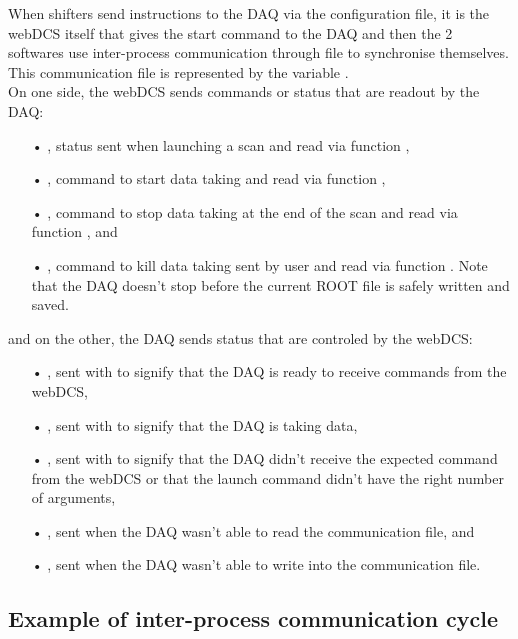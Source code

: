     When shifters send instructions to the DAQ via the configuration file, it is the webDCS itself that gives the start command to the DAQ and then the 2 softwares use inter-process communication through file to synchronise themselves. This communication file is represented by the variable .\\
    On one side, the webDCS sends commands or status that are readout by the DAQ:
    \begin{itemize}
    	\item[•] , status sent when launching a scan and read via function ,
    	\item[•] , command to start data taking and read via function ,
    	\item[•] , command to stop data taking at the end of the scan and read via function , and
    	\item[•] , command to kill data taking sent by user and read via function . Note that the DAQ doesn't stop before the current ROOT file is safely written and saved.
    \end{itemize}
and on the other, the DAQ sends status that are controled by the webDCS:
    \begin{itemize}
    	\item[•] , sent with  to signify that the DAQ is ready to receive commands from the webDCS,
    	\item[•] , sent with  to signify that the DAQ is taking data,
    	\item[•] , sent with  to signify that the DAQ didn't receive the expected command from the webDCS or that the launch command didn't have the right number of arguments,
    	\item[•] , sent when the DAQ wasn't able to read the communication file, and
    	\item[•] , sent when the DAQ wasn't able to write into the communication file.
    \end{itemize}
    
    \subsection{Example of inter-process communication cycle}
    \label{app1:ssec:commex}
    
